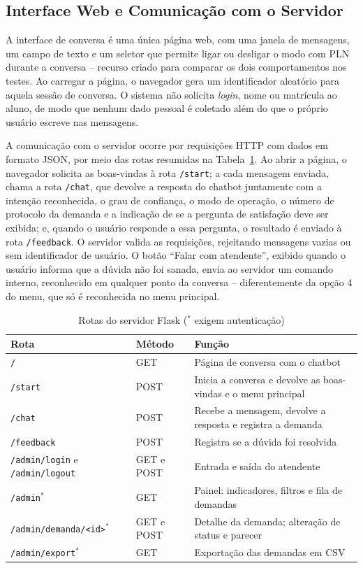 \documentclass[12pt]{article}
\begin{document}
\subsection{Interface Web e Comunicação com o Servidor}\label{sec:api}

A interface de conversa é uma única página web, com uma janela de mensagens, um
campo de texto e um seletor que permite ligar ou desligar o modo com PLN
durante a conversa -- recurso criado para comparar os dois comportamentos nos
testes. Ao carregar a página, o navegador gera um identificador aleatório para
aquela sessão de conversa. O sistema não solicita \textit{login}, nome ou
matrícula ao aluno, de modo que nenhum dado pessoal é coletado além do que o
próprio usuário escreve nas mensagens.

A comunicação com o servidor ocorre por requisições HTTP com dados em formato
JSON, por meio das rotas resumidas na Tabela~\ref{tab:rotas}. Ao abrir a
página, o navegador solicita as boas-vindas à rota \texttt{/start}; a cada
mensagem enviada, chama a rota \texttt{/chat}, que devolve a resposta do
chatbot juntamente com a intenção reconhecida, o grau de confiança, o modo de
operação, o número de protocolo da demanda e a indicação de se a pergunta de
satisfação deve ser exibida; e, quando o usuário responde a essa pergunta, o
resultado é enviado à rota \texttt{/feedback}. O servidor valida as
requisições, rejeitando mensagens vazias ou sem identificador de usuário. O
botão ``Falar com atendente'', exibido quando o usuário informa que a dúvida não
foi sanada, envia ao servidor um comando interno, reconhecido em qualquer ponto
da conversa -- diferentemente da opção 4 do menu, que só é reconhecida no menu
principal.

\begin{table}[H]
  \centering
  \begin{tabular}{|p{}|p{}|p{}|}
    \hline
    \textbf{Rota} & \textbf{Método} & \textbf{Função} \\ \hline
    \texttt{/} & GET & Página de conversa com o chatbot \\ \hline
    \texttt{/start} & POST & Inicia a conversa e devolve as boas-vindas e o menu
    principal \\ \hline
    \texttt{/chat} & POST & Recebe a mensagem, devolve a resposta e registra a
    demanda \\ \hline
    \texttt{/feedback} & POST & Registra se a dúvida foi resolvida \\ \hline
    \texttt{/admin/login} e \texttt{/admin/logout} & GET e POST & Entrada e
    saída do atendente \\ \hline
    \texttt{/admin}$^{*}$ & GET & Painel: indicadores, filtros e fila de demandas \\ \hline
    \texttt{/admin/demanda/<id>}$^{*}$ & GET e POST & Detalhe da demanda;
    alteração de status e parecer \\ \hline
    \texttt{/admin/export}$^{*}$ & GET & Exportação das demandas em CSV \\ \hline
  \end{tabular}
  \caption{Rotas do servidor Flask ($^{*}$ exigem autenticação)}
  \label{tab:rotas}
\end{table}
\end{document}

